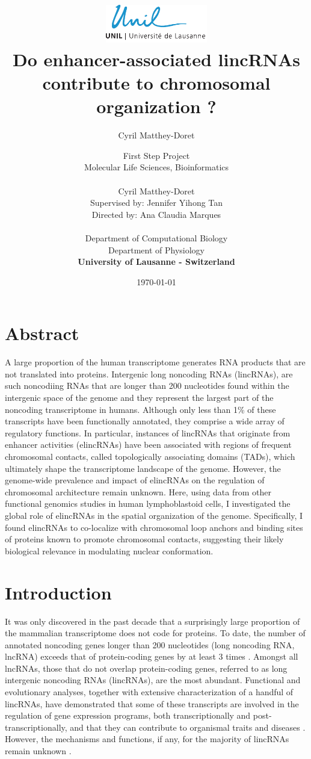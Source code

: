 \documentclass[11pt,a4paper]{report}
\author{Cyril Matthey-Doret}
\title{
\includegraphics[width=1.75in]{lo_unil06_bleu.pdf} \\
\vspace*{1in}
\textbf{Do enhancer-associated lincRNAs contribute to chromosomal organization ?}}
\author{\Large{First Step Project}\\
		Molecular Life Sciences, Bioinformatics\\
				\vspace*{0.5in} \\
		Cyril Matthey-Doret\\
        Supervised by: Jennifer Yihong Tan\\
        Directed by: Ana Claudia Marques\\
		\vspace*{0.5in} \\
		Department of Computational Biology\\
		Department of Physiology\\
        \textbf{University of Lausanne - Switzerland}\\
       } \date{\today}
\begin{document}
\renewcommand{\headrulewidth}{1pt}
\maketitle

\section*{Abstract}

A large proportion of the human transcriptome generates RNA products that are not translated into proteins. Intergenic long noncoding RNAs (lincRNAs), are such noncodiing RNAs that are longer than 200 nucleotides found within the intergenic space of the genome and they represent the largest part of the noncoding transcriptome in humans. Although only less than 1\% of these transcripts have been functionally annotated, they comprise a wide array of regulatory functions. In particular, instances of lincRNAs that originate from enhancer activities (elincRNAs) have been associated with regions of frequent chromosomal contacts, called topologically associating domains (TADs), which ultimately shape the transcriptome landscape of the genome. However, the genome-wide prevalence and impact of elincRNAs on the regulation of chromosomal architecture remain unknown. Here, using data from other functional genomics studies in human lymphoblastoid cells, I investigated the global role of elincRNAs in the spatial organization of the genome. Specifically, I found elincRNAs to co-localize with chromosomal loop anchors and binding sites of proteins known to promote chromosomal contacts, suggesting their likely biological relevance in modulating nuclear conformation.

\section*{Introduction}
It was only discovered in the past decade that a surprisingly large proportion of the mammalian transcriptome does not code for proteins. To date, the number of annotated noncoding genes longer than 200 nucleotides (long noncoding RNA, lncRNA) exceeds that of protein-coding genes by at least 3 times \cite{Iyer2015}⁠. Amongst all lncRNAs, those that do not overlap protein-coding genes, referred to as long intergenic noncoding RNAs (lincRNAs), are the most abundant. Functional and evolutionary analyses, together with extensive characterization of a handful of lincRNAs, have demonstrated that some of these transcripts are involved in the regulation of gene expression programs, both transcriptionally and post-transcriptionally, and that they can contribute to organismal traits and diseases \cite{Kornienko2013}⁠. However, the mechanisms and functions, if any, for the majority of lincRNAs remain unknown \cite{Rinn2012}⁠.  
\end{document}
